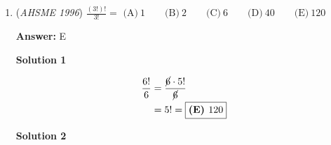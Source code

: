 \begin{enumerate}
 



\textbf{Solution 2}

If Walter had done his chores for $10$ days exceptionally well, he would have earned $5 \cdot 10 = 50$ dollars.  He got $50 - 36 = 14$ dollars less than this.

 He gets $2$ dollars docked from his pay if he doesn't do his chores well.  Therefore, he didn't do his chores well on $\frac{14}{2} = 7$ days.  The other $10 - 7 = 3$ days, he did them exceptionally well.  Therefore, the answer is $\boxed{A}$.

 



\textbf{Solution 3}

Let $b$ be the number of days Walter does his chores but doesn't do them well, and let $w$ be the number of days he does his chores exceptionally well.

 $b + w = 10$ since there are $10$ days Walter does chores.

 $3b + 5w = 36$ since $3b$ is the amount he earns from doing his chores not well, and $5w$ is the amount he earnes from doing his chores exceptionally well, and those two sum to $36$ dollars.

 Multiply the first equation by $3$ to get:

 $3b + 3w = 30$
$3b + 5w = 36$

 Subtract the first equation from the second equation to get:

 $5w - 3w = 36 - 30$
$2w = 6$
$w = 3$

 Thus, he does his chores well $3$ days, and the answer is $\boxed{A}$.

 


	\item (\textit{AHSME 1996}) $\frac{(3!)!}{3!}=$
$\text{(A)}\ 1\qquad\text{(B)}\ 2\qquad\text{(C)}\ 6\qquad\text{(D)}\ 40\qquad\text{(E)}\ 120$

 \textbf{Answer: }E



\textbf{Solution 1}


 \begin{align*} \frac{6!}{6} &= \frac{\cancel{6} \cdot 5!}{\cancel{6}} \\ &= 5! = \boxed{\textbf{(E) }120} \end{align*}





\textbf{Solution 2}



\end{enumerate}
